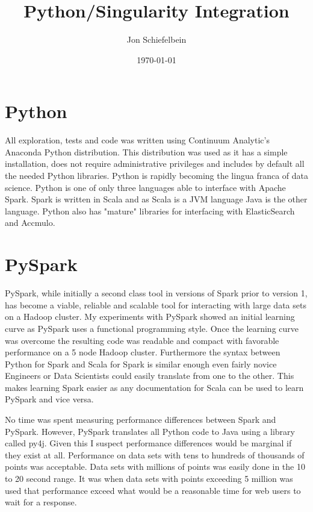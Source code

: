 \documentclass[12pt]{article}
\begin{document}
    \title{Python/Singularity Integration}
    \author{Jon Schiefelbein}
    \date{\today}
    \maketitle

    \section{Python}
    All exploration, tests and code was written using Continuum Analytic's 
    Anaconda Python distribution.  This distribution was used as it has a 
    simple installation, does not require administrative privileges and
    includes by default all the needed Python libraries.  Python is 
    rapidly becoming the lingua franca of data science.  Python is one
    of only three languages able to interface with Apache Spark.  Spark
    is written in Scala and as Scala is a JVM language Java is the other
    language.  Python also has "mature" libraries for interfacing with 
    ElasticSearch and Accmulo.

    \section{PySpark}
    PySpark, while initially a second class tool in versions of Spark prior
    to version 1, has become a viable, reliable and scalable tool for 
    interacting with large data sets on a Hadoop cluster.  My experiments with 
    PySpark showed an initial learning curve as PySpark uses a functional 
    programming style.  Once the learning curve was overcome the resulting code 
    was readable and compact with favorable performance on a 5 node Hadoop 
    cluster.  Furthermore the syntax between Python for Spark and Scala for 
    Spark is similar enough even fairly novice Engineers or Data Scientists 
    could easily translate from one to the other.  This makes learning Spark easier as
    any documentation for Scala can be used to learn PySpark and vice versa.

    No time was spent measuring performance differences between Spark and PySpark.  
    However, PySpark translates all Python code to Java using a library called 
    py4j.  Given this I suspect performance differences would be marginal if 
    they exist at all.  Performance on data sets with tens to hundreds of 
    thousands of points was acceptable.  Data sets with millions of points was 
    easily done in the 10 to 20 second range.  It was when data sets with points 
    exceeding 5 million was used that performance exceed what would be a 
    reasonable time for web users to wait for a response.
\end{document}
